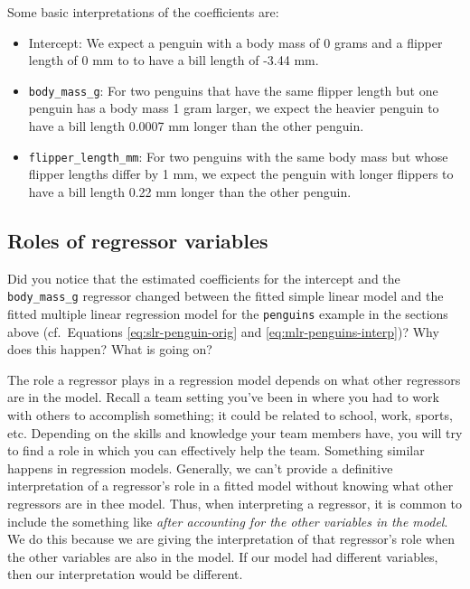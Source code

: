\documentclass[
]{book}
\providecommand{\tightlist}{%
  \setlength{\itemsep}{0pt}\setlength{\parskip}{0pt}}
\theoremstyle{definition}
\theoremstyle{definition}
\theoremstyle{definition}
\theoremstyle{definition}
\theoremstyle{remark}
\begin{document}
Some basic interpretations of the coefficients are:

\begin{itemize}
\tightlist
\item
  Intercept: We expect a penguin with a body mass of 0 grams and a
  flipper length of 0 mm to to have a bill length of -3.44 mm.
\item
  \texttt{body\_mass\_g}: For two penguins that have the same flipper length
  but one penguin has a body mass 1 gram larger, we expect the heavier
  penguin to have a bill length 0.0007 mm longer than the other
  penguin.
\item
  \texttt{flipper\_length\_mm}: For two penguins with the same body mass but
  whose flipper lengths differ by 1 mm, we expect the penguin with
  longer flippers to have a bill length 0.22 mm longer than the other
  penguin.
\end{itemize}

\hypertarget{regressor-roles}{%
\subsection{Roles of regressor variables}\label{regressor-roles}}

Did you notice that the estimated coefficients for the intercept and the
\texttt{body\_mass\_g} regressor changed between the fitted simple linear model
and the fitted multiple linear regression model for the \texttt{penguins}
example in the sections above (cf.~Equations \eqref{eq:slr-penguin-orig}
and \eqref{eq:mlr-penguins-interp})? Why does this happen? What is going
on?

The role a regressor plays in a regression model depends on what other
regressors are in the model. Recall a team setting you've been in where
you had to work with others to accomplish something; it could be related
to school, work, sports, etc. Depending on the skills and knowledge your
team members have, you will try to find a role in which you can
effectively help the team. Something similar happens in regression
models. Generally, we can't provide a definitive interpretation of a
regressor's role in a fitted model without knowing what other regressors
are in thee model. Thus, when interpreting a regressor, it is common to
include the something like \emph{after accounting for the other variables in
the model}. We do this because we are giving the interpretation of that
regressor's role when the other variables are also in the model. If our
model had different variables, then our interpretation would be
different.
\end{document}
